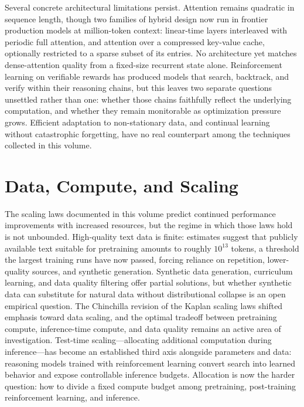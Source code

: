 Several concrete architectural limitations persist. Attention remains quadratic in sequence length, though two families of hybrid design now run in frontier production models at million-token context: linear-time layers interleaved with periodic full attention, and attention over a compressed key-value cache, optionally restricted to a sparse subset of its entries. No architecture yet matches dense-attention quality from a fixed-size recurrent state alone. Reinforcement learning on verifiable rewards has produced models that search, backtrack, and verify within their reasoning chains, but this leaves two separate questions unsettled rather than one: whether those chains faithfully reflect the underlying computation, and whether they remain monitorable as optimization pressure grows. Efficient adaptation to non-stationary data, and continual learning without catastrophic forgetting, have no real counterpart among the techniques collected in this volume.

\section*{Data, Compute, and Scaling}

The scaling laws documented in this volume predict continued performance improvements with increased resources, but the regime in which those laws hold is not unbounded. High-quality text data is finite: estimates suggest that publicly available text suitable for pretraining amounts to roughly $10^{13}$ tokens, a threshold the largest training runs have now passed, forcing reliance on repetition, lower-quality sources, and synthetic generation. Synthetic data generation, curriculum learning, and data quality filtering offer partial solutions, but whether synthetic data can substitute for natural data without distributional collapse is an open empirical question. The Chinchilla revision of the Kaplan scaling laws shifted emphasis toward data scaling, and the optimal tradeoff between pretraining compute, inference-time compute, and data quality remains an active area of investigation. Test-time scaling---allocating additional computation during inference---has become an established third axis alongside parameters and data: reasoning models trained with reinforcement learning convert search into learned behavior and expose controllable inference budgets. Allocation is now the harder question: how to divide a fixed compute budget among pretraining, post-training reinforcement learning, and inference.

